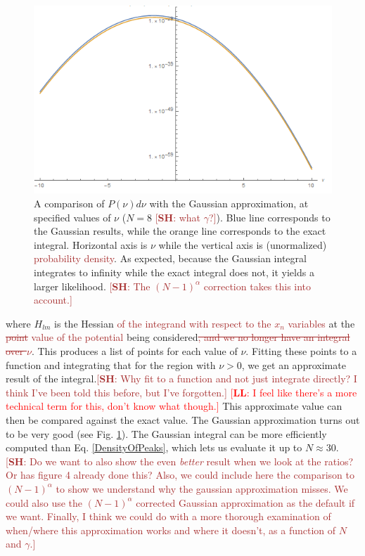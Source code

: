 \documentclass[12pt]{article}
\newcommand{\lfl}[1]{\textcolor{red}{[{\bf LL}: #1]}}
\newcommand{\SH}[1]{\textcolor{brown}{[{\bf SH}: #1]}}
\newcommand{\sh}[1]{\textcolor{brown}{#1}}
\begin{document}
\begin{figure} 
  \centering
  \includegraphics[width=\linewidth]{Comparison.png}
  \caption{A comparison of $P(\nu)d\nu$ with the Gaussian approximation, at specified values of $\nu$ ($N=8$ \SH{what $\gamma$?}). Blue line corresponds to the Gaussian results, while the orange line corresponds to the exact integral. Horizontal axis is $\nu$ while the vertical axis is (unormalized) \sh{probability density}. As expected, because the Gaussian integral integrates to infinity while the exact integral does not, it yields a larger likelihood. \SH{The $(N-1)^\alpha$ correction takes this into account.}}
  \label{Comparison}
\end{figure}

\noindent where $H_{lm}$ is the Hessian \sh{of the integrand with respect to the $x_n$ variables} at the \sh{\sout{point} value of the potential} being considered\sh{\sout{, and we no longer have an integral over $\nu$}}. This produces a list of points for each value of $\nu$. Fitting these points to a function and integrating that for the region with $\nu > 0$, we get an approximate result of the integral.\SH{Why fit to a function and not just integrate directly? I think I've been told this before, but I've forgotten.} \lfl{I feel like there's a more technical term for this, don't know what though.} This approximate value can then be compared against the exact value. The Gaussian approximation turns out to be very good (see Fig. \ref{Comparison}). The Gaussian integral can be more efficiently computed than Eq. \ref{DensityOfPeaks}, which lets us evaluate it up to $N\approx30$.
\SH{Do we want to also show the even \emph{better} result when we look at the ratios? Or has figure 4 already done this? Also, we could include here the comparison to $(N-1)^\alpha$ to show we understand why the gaussian approximation misses. We could also use the $(N-1)^\alpha$ corrected Gaussian approximation as the default if we want. Finally, I think we could do with a more thorough examination of when/where this approximation works and where it doesn't, as a function of $N$ and $\gamma$.}
\end{document}

